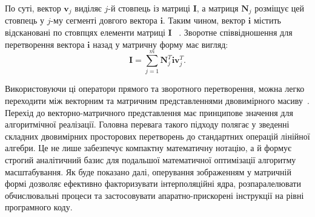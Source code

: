 По суті, вектор $\mathbf{v}_j$ виділяє $j$-й стовпець із матриці $\mathbf{I}$, а матриця $\mathbf{N}_j$ розміщує цей стовпець у $j$-му сегменті довгого вектора $\mathbf{i}$. Таким чином, вектор $\mathbf{i}$ містить відскановані по стовпцях елементи матриці $\mathbf{I}$ ~\cite{pratt2014introduction}. Зворотне співвідношення для перетворення вектора $\mathbf{i}$ назад у матричну форму має вигляд:
\begin{equation}
	\mathbf{I} = \sum_{j=1}^{m} \mathbf{N}_j^T \mathbf{i} \mathbf{v}_j^T.
\end{equation}

Використовуючи ці оператори прямого та зворотного перетворення, можна легко переходити між векторним та матричним представленнями двовимірного масиву~\cite{pratt2014introduction}. Перехід до векторно-матричного представлення має принципове значення для алгоритмічної реалізації. Головна перевага такого підходу полягає у зведенні складних двовимірних просторових перетворень до стандартних операцій лінійної алгебри. Це не лише забезпечує компактну математичну нотацію, а й формує строгий аналітичний базис для подальшої математичної оптимізації алгоритму масштабування. Як буде показано далі, оперування зображенням у матричній формі дозволяє ефективно факторизувати інтерполяційні ядра, розпаралелювати обчислювальні процеси та застосовувати апаратно-прискорені інструкції на рівні програмного коду.